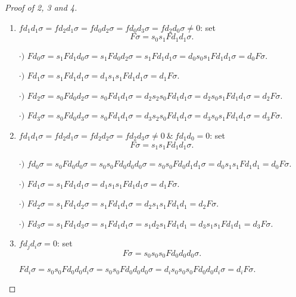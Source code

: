 \documentclass[thesis.tex]{subfiles}
\begin{document}
\begin{proof}[Proof of 2, 3 and 4]
\begin{enumerate}[a)]
\begin{enumerate}[{iv}-a.]
            \item\underline{$fd_1d_1\sigma=fd_2d_1\sigma=fd_0d_2\sigma=fd_0d_3\sigma=fd_2d_0\sigma\neq0$}: set $$F\sigma=s_0s_1Fd_1d_1\sigma.$$

            $\cdot)$ $Fd_0\sigma=s_1Fd_1d_0\sigma=s_1Fd_0d_2\sigma=s_1Fd_1d_1\sigma=d_0s_0s_1Fd_1d_1\sigma=d_0F\sigma.$

            $\cdot)$ $Fd_1\sigma=s_1Fd_1d_1\sigma=d_1s_1s_1Fd_1d_1\sigma=d_1F\sigma$.

            $\cdot)$ $Fd_2\sigma=s_0Fd_0d_2\sigma=s_0Fd_1d_1\sigma=d_2s_2s_0Fd_1d_1\sigma=d_2s_0s_1Fd_1d_1\sigma=d_2F\sigma.$

            $\cdot)$ $Fd_3\sigma=s_0Fd_0d_3\sigma=s_0Fd_1d_1\sigma=d_3s_2s_0Fd_1d_1\sigma=d_3s_0s_1Fd_1d_1\sigma=d_3F\sigma.$

            \item\underline{$fd_1d_1\sigma=fd_2d_1\sigma=fd_2d_2\sigma=fd_2d_3\sigma\neq0\ \&\ fd_1d_0=0$}: set $$F\sigma=s_1s_1Fd_1d_1\sigma.$$

            $\cdot)$ $fd_0\sigma=s_0Fd_0d_0\sigma=s_0s_0Fd_0d_0d_0\sigma=s_0s_0Fd_0d_1d_1\sigma=d_0s_1s_1Fd_1d_1=d_0F\sigma$.

            $\cdot)$ $Fd_1\sigma=s_1Fd_1d_1\sigma=d_1s_1s_1Fd_1d_1\sigma=d_1F\sigma.$

            $\cdot)$ $Fd_2\sigma=s_1Fd_1d_2\sigma=s_1Fd_1d_1\sigma=d_2s_1s_1Fd_1d_1=d_2F\sigma.$

            $\cdot)$ $Fd_3\sigma=s_1Fd_1d_3\sigma=s_1Fd_1d_1\sigma=s_1d_2s_1Fd_1d_1=d_3s_1s_1Fd_1d_1=d_3F\sigma.$

            \item\underline{$fd_jd_i\sigma=0$}: set $$F\sigma=s_0s_0s_0Fd_0d_0d_0\sigma.$$

            $Fd_i\sigma=s_0s_0Fd_0d_0d_i\sigma=s_0s_0Fd_0d_0d_0\sigma=d_is_0s_0s_0Fd_0d_0d_i\sigma=d_iF\sigma.$

            \end{enumerate}

    \end{enumerate}
\end{proof}
\end{document}
